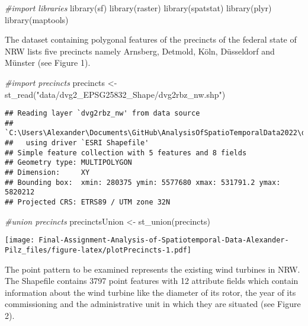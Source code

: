 \documentclass[
]{article}
\newenvironment{Shaded}{\begin{snugshade}}{\end{snugshade}}
\newcommand{\CommentTok}[1]{\textcolor[rgb]{0.56,0.35,0.01}{\textit{#1}}}
\newcommand{\FunctionTok}[1]{\textcolor[rgb]{0.00,0.00,0.00}{#1}}
\newcommand{\NormalTok}[1]{#1}
\newcommand{\OtherTok}[1]{\textcolor[rgb]{0.56,0.35,0.01}{#1}}
\newcommand{\StringTok}[1]{\textcolor[rgb]{0.31,0.60,0.02}{#1}}
\begin{document}
\begin{Shaded}
\begin{Highlighting}[]
\CommentTok{\#import libraries}
\FunctionTok{library}\NormalTok{(sf) }
\FunctionTok{library}\NormalTok{(raster)}
\FunctionTok{library}\NormalTok{(spatstat)}
\FunctionTok{library}\NormalTok{(plyr)}
\FunctionTok{library}\NormalTok{(maptools)}
\end{Highlighting}
\end{Shaded}

The dataset containing polygonal features of the precincts of the
federal state of NRW lists five precincts namely Arnsberg, Detmold,
Köln, Düsseldorf and Münster (see Figure 1).

\begin{Shaded}
\begin{Highlighting}[]
\CommentTok{\#import precincts}
\NormalTok{precincts }\OtherTok{\textless{}{-}} \FunctionTok{st\_read}\NormalTok{(}\StringTok{"data/dvg2\_EPSG25832\_Shape/dvg2rbz\_nw.shp"}\NormalTok{)}
\end{Highlighting}
\end{Shaded}

\begin{verbatim}
## Reading layer `dvg2rbz_nw' from data source 
##   `C:\Users\Alexander\Documents\GitHub\AnalysisOfSpatioTemporalData2022\data\dvg2_EPSG25832_Shape\dvg2rbz_nw.shp' 
##   using driver `ESRI Shapefile'
## Simple feature collection with 5 features and 8 fields
## Geometry type: MULTIPOLYGON
## Dimension:     XY
## Bounding box:  xmin: 280375 ymin: 5577680 xmax: 531791.2 ymax: 5820212
## Projected CRS: ETRS89 / UTM zone 32N
\end{verbatim}

\begin{Shaded}
\begin{Highlighting}[]
\CommentTok{\#union precincts}
\NormalTok{precinctsUnion }\OtherTok{\textless{}{-}} \FunctionTok{st\_union}\NormalTok{(precincts)}
\end{Highlighting}
\end{Shaded}

\texttt{[image: Final-Assignment-Analysis-of-Spatiotemporal-Data-Alexander-Pilz\_files/figure-latex/plotPrecincts-1.pdf]}

The point pattern to be examined represents the existing wind turbines
in NRW. The Shapefile contains 3797 point features with 12 attribute
fields which contain information about the wind turbine like the
diameter of its rotor, the year of its commissioning and the
administrative unit in which they are situated (see Figure 2).
\end{document}

